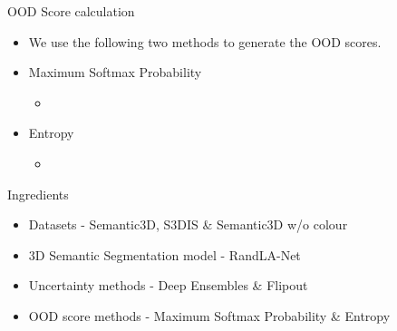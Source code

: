 \documentclass[aspectratio=169]{beamer}
\begin{document}
\begin{frame}{OOD Score calculation}
    \begin{itemize}
        \item We use the following two methods to generate the OOD scores.
        \item Maximum Softmax Probability
        \begin{itemize}
            \item 
        \end{itemize}
        \item Entropy
        \begin{itemize}
            \item 
        \end{itemize}
    \end{itemize}
\end{frame}
\begin{frame}[noframenumbering]{Ingredients}
    \begin{itemize}
        \item Datasets - Semantic3D, S3DIS \& Semantic3D w/o colour
        \item 3D Semantic Segmentation model - RandLA-Net
        \item Uncertainty methods - Deep Ensembles \& Flipout
        \item OOD score methods - Maximum Softmax Probability \& Entropy
    \end{itemize}
\end{frame}
\end{document}

